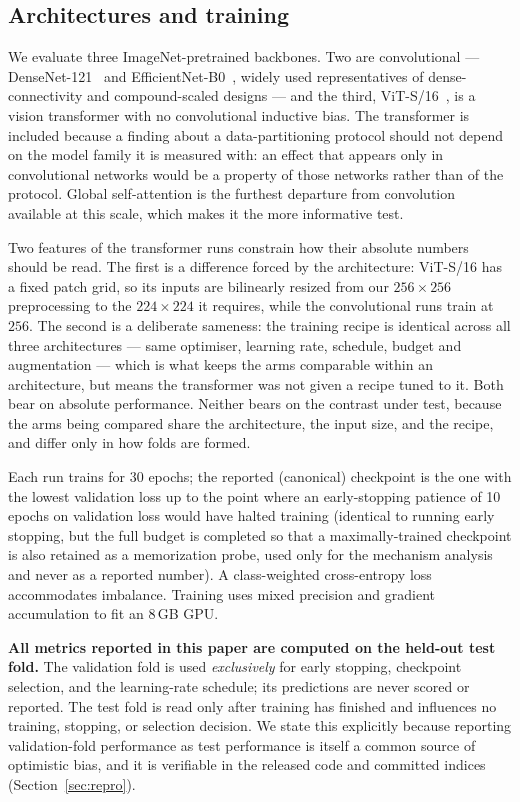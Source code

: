 \documentclass{ieeeaccess}
\newcommand{\vcite}[1]{\cite{#1}}
\begin{document}
\subsection{Architectures and training}
We evaluate three ImageNet-pretrained backbones. Two are convolutional --- DenseNet-121~\vcite{huang2017densenet} and EfficientNet-B0~\vcite{tan2019efficientnet}, widely used
representatives of dense-connectivity and compound-scaled designs --- and the third, ViT-S/16~\vcite{dosovitskiy2021vit}, is a vision transformer with no convolutional inductive bias. The
transformer is included because a finding about a data-partitioning protocol should not depend on
the model family it is measured with: an effect that appears only in convolutional networks would be
a property of those networks rather than of the protocol. Global self-attention is the furthest
departure from convolution available at this scale, which makes it the more informative test.

Two features of the transformer runs constrain how their absolute numbers should be read. The first
is a difference forced by the architecture: ViT-S/16 has a fixed patch grid, so its inputs are
bilinearly resized from our $256 \times 256$ preprocessing to the $224 \times 224$ it requires, while
the convolutional runs train at $256$. The second is a deliberate sameness: the training recipe is
identical across all three architectures --- same optimiser, learning rate, schedule, budget and
augmentation --- which is what keeps the arms comparable within an architecture, but means the
transformer was not given a recipe tuned to it. Both bear on absolute performance. Neither bears on the contrast under test, because the arms being compared
share the architecture, the input size, and the recipe, and differ only in how folds are formed.

Each run
trains for 30 epochs; the reported (canonical) checkpoint is the
one with the lowest validation loss up to the point where an early-stopping patience of 10 epochs on
validation loss would have halted training (identical to running early stopping, but the full budget
is completed so that a maximally-trained checkpoint is also retained as a memorization probe, used
only for the mechanism analysis and never as a reported number). A class-weighted cross-entropy loss
accommodates imbalance.
Training uses mixed precision and gradient accumulation to fit an 8\,GB GPU.

\textbf{All metrics reported in this paper are computed on the held-out test fold.} The validation
fold is used \emph{exclusively} for early stopping, checkpoint selection, and the learning-rate
schedule; its predictions are never scored or reported. The test fold is read only after training has
finished and influences no training, stopping, or selection decision. We state this explicitly
because reporting validation-fold performance as test performance is itself a common source of
optimistic bias, and it is verifiable in the released code and committed indices
(Section~\ref{sec:repro}).
\end{document}

